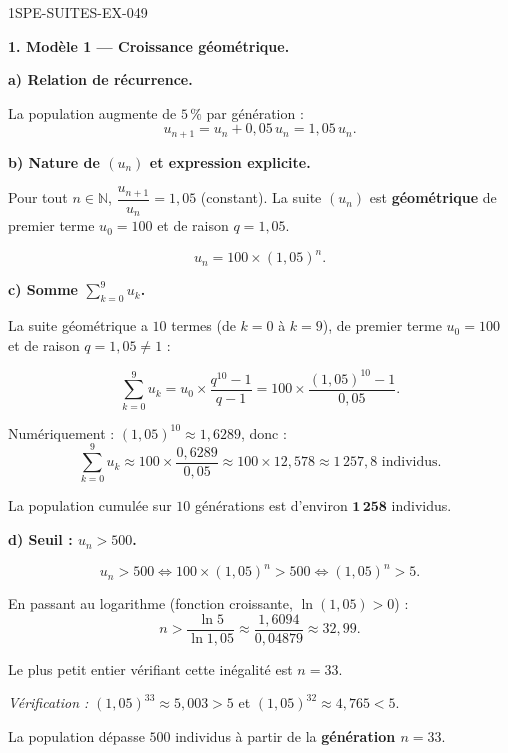 \begin{corrige}{1SPE-SUITES-EX-049}

\textbf{1. Modèle 1 — Croissance géométrique.}

\textbf{a) Relation de récurrence.}

La population augmente de $5\,\%$ par génération :
\[
u_{n+1} = u_n + 0{,}05\,u_n = 1{,}05\,u_n.
\]


\textbf{b) Nature de $(u_n)$ et expression explicite.}

Pour tout $n \in \mathbb{N}$, $\dfrac{u_{n+1}}{u_n} = 1{,}05$ (constant). La suite $(u_n)$ est \textbf{géométrique} de premier terme $u_0 = 100$ et de raison $q = 1{,}05$.

\[
\boxed{u_n = 100 \times (1{,}05)^n.}
\]

\textbf{c) Somme $\displaystyle\sum_{k=0}^{9} u_k$.}

La suite géométrique a $10$ termes (de $k = 0$ à $k = 9$), de premier terme $u_0 = 100$ et de raison $q = 1{,}05 \neq 1$ :

\[
\sum_{k=0}^{9} u_k = u_0 \times \frac{q^{10} - 1}{q - 1} = 100 \times \frac{(1{,}05)^{10} - 1}{0{,}05}.
\]

Numériquement : $(1{,}05)^{10} \approx 1{,}6289$, donc :
\[
\sum_{k=0}^{9} u_k \approx 100 \times \frac{0{,}6289}{0{,}05} \approx 100 \times 12{,}578 \approx 1\,257{,}8 \text{ individus.}
\]

La population cumulée sur $10$ générations est d'environ $\mathbf{1\,258}$ individus.

\textbf{d) Seuil : $u_n > 500$.}


\[
u_n > 500 \iff 100 \times (1{,}05)^n > 500 \iff (1{,}05)^n > 5.
\]

En passant au logarithme (fonction croissante, $\ln(1{,}05) > 0$) :
\[
n > \frac{\ln 5}{\ln 1{,}05} \approx \frac{1{,}6094}{0{,}04879} \approx 32{,}99.
\]

Le plus petit entier vérifiant cette inégalité est $n = 33$.

\textit{Vérification :} $(1{,}05)^{33} \approx 5{,}003 > 5$ \checkmark \quad et \quad $(1{,}05)^{32} \approx 4{,}765 < 5$.

La population dépasse $500$ individus à partir de la \textbf{génération $n = 33$}.


\end{corrige}
